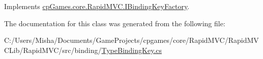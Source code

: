 Implements \mbox{\hyperlink{interfacecp_games_1_1core_1_1_rapid_m_v_c_1_1_i_binding_key_factory_acebadb5b1ee05c449b3872428ce554ff}{cp\+Games.\+core.\+Rapid\+M\+V\+C.\+I\+Binding\+Key\+Factory}}.



The documentation for this class was generated from the following file\+:\begin{DoxyCompactItemize}
\item 
C\+:/\+Users/\+Misha/\+Documents/\+Game\+Projects/cpgames/core/\+Rapid\+M\+V\+C/\+Rapid\+M\+V\+C\+Lib/\+Rapid\+M\+V\+C/src/binding/\mbox{\hyperlink{_type_binding_key_8cs}{Type\+Binding\+Key.\+cs}}\end{DoxyCompactItemize}
